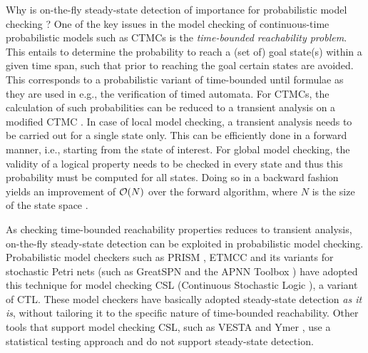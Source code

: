 \documentclass[times, 10pt,twocolumn]{article}
\begin{document}
Why is on-the-fly steady-state detection of importance for probabilistic model checking \cite{Kwiatkowska_SLCS03}?
One of the key issues in the model checking of continuous-time probabilistic models such as 
CTMCs is the \emph{time-bounded reachability problem}. 
This entails to determine the probability to reach a (set of) goal state(s) within a given time span, 
such that prior to reaching the goal certain states are avoided. 
This corresponds to a probabilistic variant of time-bounded until formulae as they are used in 
e.g., the verification of timed automata.
For CTMCs, the calculation of such probabilities can be reduced to a transient analysis on a 
modified CTMC \cite{BaierHHK_TSE03}. 
In case of local model checking, a transient analysis needs to be carried out for a single state 
only.
This can be efficiently done in a forward manner, i.e., starting from the state of interest. 
For global model checking, the validity of a logical property needs to be checked in every state 
and thus this probability must be computed for all states. 
Doing so in a backward fashion yields an improvement of ${\cal O}(N)$ over the forward algorithm,
where $N$ is the size of the state space \cite{KatoenKNP_LNCS01}.

As checking time-bounded reachability properties reduces to transient analysis, on-the-fly steady-state detection can be exploited in probabilistic model checking.
Probabilistic model checkers such as PRISM \cite{KwiatkowskaNP_QEST04}, ETMCC \cite{HermansKMS_IJSTTT03} and its variants for stochastic
Petri nets (such as GreatSPN \cite{DAprileDS_DS04} and the APNN Toolbox \cite{BuchholzFKT_MMECCS03}) have adopted this technique
for model checking CSL (Continuous Stochastic Logic \cite{AzizSSB_ACMTCL00,BaierHHK_TSE03}), a variant of CTL.
These model checkers have basically adopted steady-state detection \emph{as it is}, without 
tailoring it to the specific nature of time-bounded reachability.
Other tools that support model checking CSL, such as VESTA \cite{SenVA_CAV05} and Ymer \cite{Younes_CAV05}, use a statistical testing approach and do not support steady-state detection. 
\end{document}
